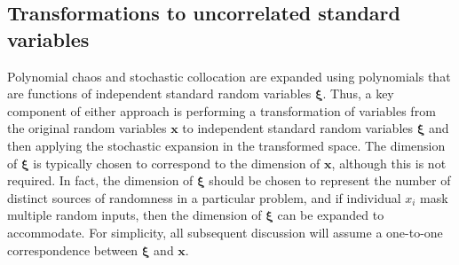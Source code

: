 \subsection{Transformations to uncorrelated standard variables} \label{uq:expansion:trans}

Polynomial chaos and stochastic collocation are expanded using
polynomials that are functions of independent standard random
variables $\boldsymbol{\xi}$.  Thus, a key component of either
approach is performing a transformation of variables from the original
random variables $\boldsymbol{x}$ to independent standard random
variables $\boldsymbol{\xi}$ and then applying the stochastic
expansion in the transformed space.  The dimension of
$\boldsymbol{\xi}$ is typically chosen to correspond to the dimension
of $\boldsymbol{x}$, although this is not required.  In fact, the
dimension of $\boldsymbol{\xi}$ should be chosen to represent the
number of distinct sources of randomness in a particular problem, and
if individual $x_i$ mask multiple random inputs, then the dimension of
$\boldsymbol{\xi}$ can be expanded to accommodate.  For simplicity,
all subsequent discussion will assume a one-to-one correspondence
between $\boldsymbol{\xi}$ and $\boldsymbol{x}$.

